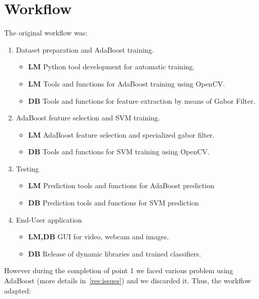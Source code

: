 \section{Workflow}

The original workflow was:

\begin{enumerate}
  \item Dataset preparation and AdaBoost training.
    \begin{itemize}
      \item \textbf{LM} Python tool development for automatic training.
      \item \textbf{LM} Tools and functions for AdaBoost training using OpenCV.
      \item \textbf{DB} Tools and functions for feature extraction by means of Gabor Filter.
    \end{itemize}
  \item AdaBoost feature selection and SVM training.
    \begin{itemize}
      \item \textbf{LM} AdaBoost feature selection and specialized gabor filter.
      \item \textbf{DB} Tools and functions for SVM training using OpenCV.
    \end{itemize}
  \item Testing
    \begin{itemize}
      \item \textbf{LM} Prediction tools and functions for AdaBoost prediction
      \item \textbf{DB} Prediction tools and functions for SVM prediction
    \end{itemize}
  \item End-User application
    \begin{itemize}
      \item \textbf{LM,DB} GUI for video, webcam and images.
      \item \textbf{DB} Release of dynamic libraries and trained classifiers.
    \end{itemize}
\end{enumerate}

However during the completion of point 1 we faced various problem using
AdaBoost (more details in~\ref{res:issues}) and we discarded it. Thus, the
workflow adapted:

